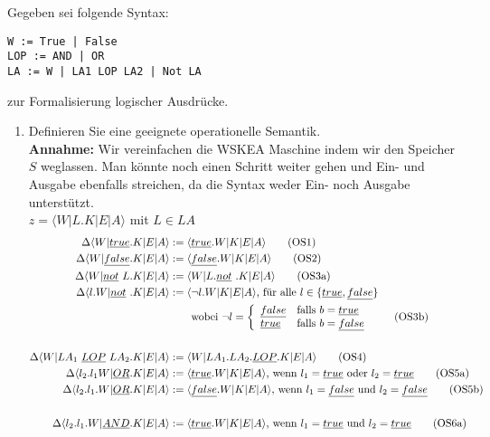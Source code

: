 \documentclass[ngerman,a4paper]{report}
\begin{document}
Gegeben sei folgende Syntax:
\begin{lstlisting}
W := True | False
LOP := AND | OR
LA := W | LA1 LOP LA2 | Not LA
\end{lstlisting}
zur Formalisierung logischer Ausdrücke.
\begin{enumerate}
\item Definieren Sie eine geeignete operationelle Semantik.\\
\textbf{Annahme:} Wir vereinfachen die WSKEA Maschine indem wir den Speicher $S$ weglassen. Man könnte noch einen Schritt weiter gehen und Ein- und Ausgabe ebenfalls streichen, da die Syntax weder Ein- noch Ausgabe unterstützt.\\
$z=\langle W|L.K|E|A\rangle$ mit $L \in LA$
\begin{align}
\Delta\langle W|\underline{true}.K|E|A\rangle &:= \langle \underline{true}.W|K|E|A\rangle\tag{OS1}\\
\Delta\langle W|\underline{false}.K|E|A\rangle &:= \langle \underline{false}.W|K|E|A\rangle\tag{OS2}\\
\Delta\langle W|\underline{not}\  L.K|E|A\rangle &:= \langle W|L.\underline{not}\ .K|E|A\rangle\tag{OS3a}\\
\Delta\langle l.W|\underline{not}\ .K|E|A\rangle &:= \langle \neg l.W|K|E|A\rangle\text{, für alle }l\in \{\underline{true},\underline{false}\}\notag\\&\quad\quad\text{wobei }\neg l = \left\lbrace\begin{array}{l l}\underline{false}& \text{falls } b=\underline{true}\\\underline{true}& \text{falls } b=\underline{false}\\\end{array}\right.\tag{OS3b}\\\notag \\
\Delta\langle W|LA_1\ \underline{LOP}\ LA_2.K|E|A\rangle &:= \langle W|LA_1.LA_2.\underline{LOP}.K|E|A\rangle\tag{OS4}\\
\Delta\langle l_2.l_1W|\underline{OR}.K|E|A\rangle &:= \langle \underline{true}.W|K|E|A\rangle\text{, wenn }l_1=\underline{true}\text{ oder }l_2=\underline{true}\tag{OS5a}\\
\Delta\langle l_2.l_1.W|\underline{OR}.K|E|A\rangle &:= \langle \underline{false}.W|K|E|A\rangle\text{, wenn }l_1=\underline{false}\text{ und }l_2=\underline{false}\tag{OS5b}\\\notag \\
\Delta\langle l_2.l_1.W|\underline{AND}.K|E|A\rangle &:= \langle \underline{true}.W|K|E|A\rangle\text{, wenn }l_1=\underline{true}\text{ und }l_2=\underline{true}\tag{OS6a}\\

\end{align}
\end{enumerate}
\end{document}

